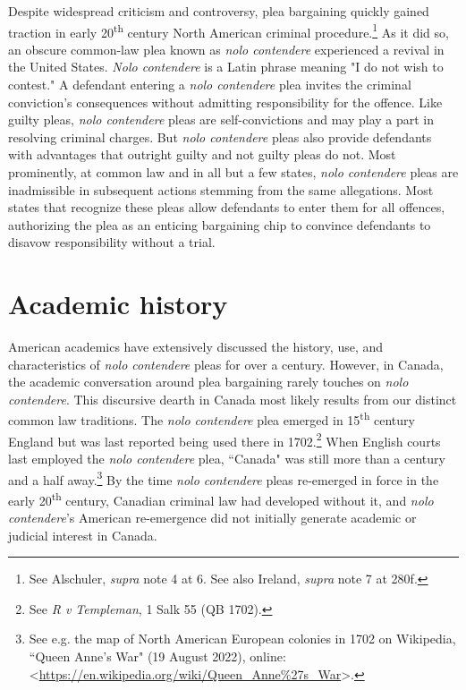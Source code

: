 Despite widespread criticism and controversy, plea bargaining quickly gained traction in early 20\textsuperscript{th} century North American criminal procedure.\footnote{See Alschuler, \textit{supra} note 4 at 6. See also Ireland, \textit{supra} note 7 at 280f.} As it did so, an obscure common-law plea known as \textit{nolo contendere} experienced a revival in the United States. \textit{Nolo contendere} is a Latin phrase meaning "I do not wish to contest." A defendant entering a \textit{nolo contendere} plea invites the criminal conviction's consequences without admitting responsibility for the offence. Like guilty pleas, \textit{nolo contendere} pleas are self-convictions and may play a part in resolving criminal charges. But \textit{nolo contendere} pleas also provide defendants with advantages that outright guilty and not guilty pleas do not. Most prominently, at common law and in all but a few states, \textit{nolo contendere} pleas are inadmissible in subsequent actions stemming from the same allegations. Most states that recognize these pleas allow defendants to enter them for all offences, authorizing the plea as an enticing bargaining chip to convince defendants to disavow responsibility without a trial.

\section{Academic history}

American academics have extensively discussed the history, use, and characteristics of \textit{nolo contendere} pleas for over a century. However, in Canada, the academic conversation around plea bargaining rarely touches on \textit{nolo contendere}. This discursive dearth in Canada most likely results from our distinct common law traditions. The \textit{nolo contendere} plea emerged in 15\textsuperscript{th} century England but was last reported being used there in 1702.\footnote{See \textit{R v Templeman}, 1 Salk 55 (QB 1702).} When English courts last employed the \textit{nolo contendere} plea, ``Canada" was still more than a century and a half away.\footnote{See e.g. the map of North American European colonies in 1702 on Wikipedia, ``Queen Anne's War" (19 August 2022), online: \textless \url{https://en.wikipedia.org/wiki/Queen_Anne\%27s_War}\textgreater.} By the time \textit{nolo contendere} pleas re-emerged in force in the early 20\textsuperscript{th} century, Canadian criminal law had developed without it, and \textit{nolo contendere}'s American re-emergence did not initially generate academic or judicial interest in Canada.

